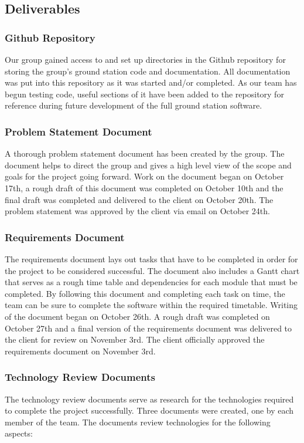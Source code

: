 \subsection{Deliverables}
\subsubsection{Github Repository}
Our group gained access to and set up directories in the Github repository for storing the group's ground station code and documentation.
All documentation was put into this repository as it was started and/or completed.
As our team has begun testing code, useful sections of it have been added to the repository for reference during future development of the full ground station software.

\subsubsection{Problem Statement Document}
A thorough problem statement document has been created by the group.
The document helps to direct the group and gives a high level view of the scope and goals for the project going forward.
Work on the document began on October 17th, a rough draft of this document was completed on October 10th and the final draft was completed and delivered to the client on October 20th.
The problem statement was approved by the client via email on October 24th.

\subsubsection{Requirements Document}
The requirements document lays out tasks that have to be completed in order for the project to be considered successful.
The document also includes a Gantt chart that serves as a rough time table and dependencies for each module that must be completed.
By following this document and completing each task on time, the team can be sure to complete the software within the required timetable.
Writing of the document began on October 26th.
A rough draft was completed on October 27th and a final version of the requirements document was delivered to the client for review on November 3rd.
The client officially approved the requirements document on November 3rd.

\subsubsection{Technology Review Documents}
The technology review documents serve as research for the technologies required to complete the project successfully.
Three documents were created, one by each member of the team.
The documents review technologies for the following aspects: 

